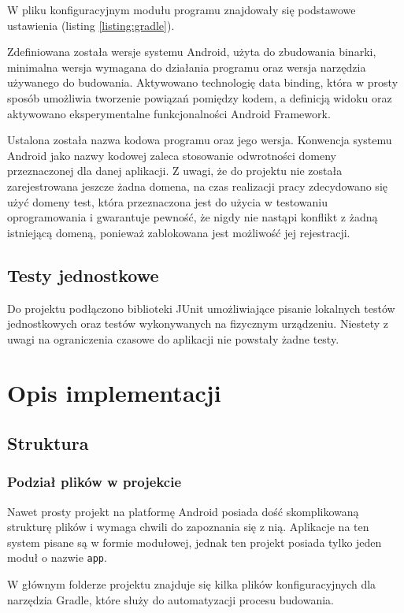 \documentclass[polish,polish,a4paper,12pt]{article}
\let\sectioncmd\section
\renewcommand{\section}{\clearpage\sectioncmd}
\begin{document}
	W pliku konfiguracyjnym modułu programu znajdowały się podstawowe ustawienia (listing \ref{listing:gradle}).

	Zdefiniowana została wersje systemu Android, użyta do zbudowania binarki, minimalna wersja wymagana do działania programu oraz wersja narzędzia używanego do budowania. Aktywowano technologię data binding, która w prosty sposób umożliwia tworzenie powiązań pomiędzy kodem, a definicją widoku oraz aktywowano eksperymentalne funkcjonalności Android Framework.

	Ustalona została nazwa kodowa programu oraz jego wersja. Konwencja systemu Android jako nazwy kodowej zaleca stosowanie odwrotności domeny przeznaczonej dla danej aplikacji. Z uwagi, że do projektu nie została zarejestrowana jeszcze żadna domena, na czas realizacji pracy zdecydowano się użyć domeny test, która przeznaczona jest do użycia w testowaniu oprogramowania i gwarantuje pewność, że nigdy nie nastąpi konflikt z żadną istniejącą domeną, ponieważ zablokowana jest możliwość jej rejestracji.

	\subsection{Testy jednostkowe}

	Do projektu podłączono biblioteki JUnit umożliwiające pisanie lokalnych testów jednostkowych oraz testów wykonywanych na fizycznym urządzeniu. Niestety z uwagi na ograniczenia czasowe do aplikacji nie powstały żadne testy.

\section{Opis implementacji}\label{implementation}
	\subsection{Struktura}
		\subsubsection{Podział plików w projekcie}

		Nawet prosty projekt na platformę Android posiada dość skomplikowaną strukturę plików i wymaga chwili do zapoznania się z nią. Aplikacje na ten system pisane są w formie modułowej, jednak ten projekt posiada tylko jeden moduł o nazwie \texttt{app}.

		W głównym folderze projektu znajduje się kilka plików konfiguracyjnych dla narzędzia Gradle, które służy do automatyzacji procesu budowania.
\end{document}

